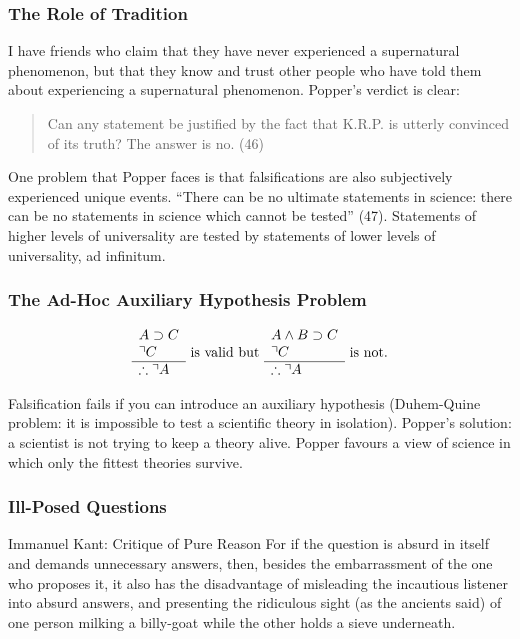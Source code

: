 \documentclass[xcolor=dvipsnames]{beamer}
\begin{document}
\begin{frame}
  \frametitle{The Role of Tradition}
  I have friends who claim that they have never experienced a
  supernatural phenomenon, but that they know and trust other people
  who have told them about experiencing a supernatural phenomenon.
  Popper's verdict is clear:
  \begin{quote}
    Can any statement be justified by the fact that K.R.P. is utterly
    convinced of its truth? The answer is no. (46)
  \end{quote}
  One problem that Popper faces is that falsifications are also
  subjectively experienced unique events. ``There can be no ultimate
  statements in science: there can be no statements in science which
  cannot be tested'' (47). Statements of higher levels of
  universality are tested by statements of lower levels of
  universality, ad infinitum. 
\end{frame}

\begin{frame}
  \frametitle{The Ad-Hoc Auxiliary Hypothesis Problem}
  \begin{equation}
    \label{eq:uangaiso}
\begin{array}{l}
  A\supset{}C \\
  \urcorner{}C \\ \hline
  \therefore{}\urcorner{}A
\end{array}
\mbox{ is valid but }
\begin{array}{l}
  A\wedge{}B\supset{}C \\
  \urcorner{}C \\ \hline
  \therefore{}\urcorner{}A
\end{array}
\mbox{ is not.}\notag
  \end{equation}

\bigskip

Falsification fails if you can introduce an auxiliary
hypothesis (Duhem-Quine problem: it is impossible to test a scientific
theory in isolation). Popper's solution: a scientist is not trying to
keep a theory alive. Popper favours a view of science in which only
the fittest theories survive. 
\end{frame}

\begin{frame}
  \frametitle{Ill-Posed Questions}
  \begin{block}{Immanuel Kant: Critique of Pure Reason}
    For if the question is absurd in itself and demands unnecessary
    answers, then, besides the embarrassment of the one who proposes
    it, it also has the disadvantage of misleading the incautious
    listener into absurd answers, and presenting the ridiculous sight
    (as the ancients said) of one person milking a billy-goat while
    the other holds a sieve underneath.
  \end{block}
\end{frame}
\end{document}
